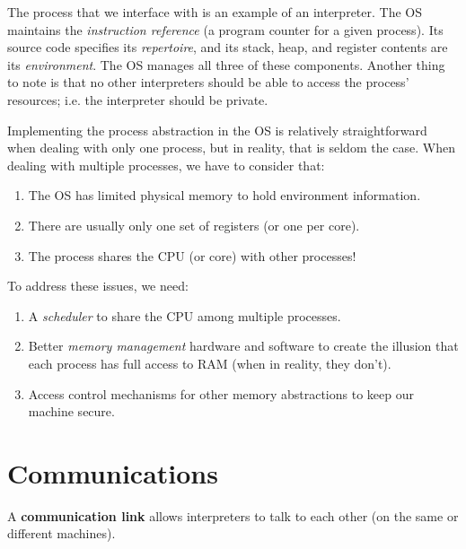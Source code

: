 \documentclass{report}
\newcommand{\asideBegin}[1]{\begin{tcolorbox}[colback=orange!5!white,colframe=black!75!orange,title={Aside:
      #1}]}
\newcommand{\asideEnd}{\end{tcolorbox}}
\begin{document}
\begin{tcolorbox}[colback=blue!5!white,colframe=black!75!blue,title=Example: Processing Processes] 
  The process that we interface with is an example of an interpreter. The OS maintains the
  \textit{instruction reference} (a program counter for a given process). Its source code specifies
  its \textit{repertoire}, and its stack, heap, and register contents are its
  \textit{environment}. The OS manages all three of these components. Another thing to note is that
  no other interpreters should be able to access the process' resources; i.e. the interpreter should
  be private.
\end{tcolorbox}


\asideBegin{Implementation}
Implementing the process abstraction in the OS is relatively straightforward when dealing with only
one process, but in reality, that is seldom the case. When dealing with multiple processes, we have
to consider that:
\begin{enumerate}[label=\textit{(\roman*)}]
\item The OS has limited physical memory to hold environment information.
\item There are usually only one set of registers (or one per core).
\item The process shares the CPU (or core) with other processes!
\end{enumerate}
To address these issues, we need:
\begin{enumerate}[label=\textit{(\roman*)}]
\item A \textit{scheduler} to share the CPU among multiple processes.
\item Better \textit{memory management} hardware and software to create the illusion that
  each process has full access to RAM (when in reality, they don't).
\item Access control mechanisms for other memory abstractions to keep our machine secure.
\end{enumerate}
\asideEnd





\section{Communications}

\begin{tcolorbox}[title=Definition: Communication Link]
  A \textbf{communication link} allows interpreters to talk to each other (on the same or different machines).
\end{tcolorbox}
\end{document}
